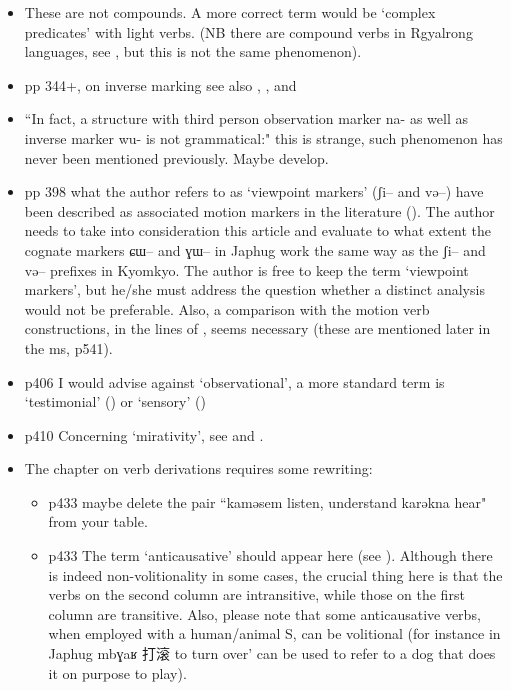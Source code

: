 \documentclass[oldfontcommands,oneside,a4paper,11pt]{article}
\newcommand{\ipa}[1]{{\phon \mbox{#1}}} %
\newcommand{\zh}[1]{{\cn #1}}
\begin{document}
\begin{itemize}
\item These are not compounds. A more correct term would be `complex predicates' with light verbs. (NB there are compound verbs in Rgyalrong languages, see \citet{jacques12incorp}, but this is not the same phenomenon).
\item pp 344+, on inverse marking see also \citet{gongxun14agreement}, \citet{jacques14inverse}, \citet{jacques14rtau} and \citet{lai14person}
\item ``In fact, a structure with third person observation marker na- as well as inverse marker wu- is not
grammatical:" this is strange, such phenomenon has never been mentioned previously. Maybe develop.
\item pp 398 what the author refers to as `viewpoint markers' (\ipa{ʃi--} and \ipa{və--}) have been described as associated motion markers in the literature (\citealt{jacques13harmonization}). The author needs to take into consideration this article and evaluate to what extent the cognate markers \ipa{ɕɯ--} and \ipa{ɣɯ--} in Japhug work the same way as the \ipa{ʃi--} and \ipa{və--} prefixes in Kyomkyo. The author is free to keep the term `viewpoint markers', but he/she must address  the question whether a distinct analysis would not be preferable. Also, a comparison with the motion verb constructions, in the lines of \citet[203]{jacques13harmonization}, seems necessary (these are mentioned later in the ms, p541).
\item p406 I would advise against `observational', a more standard term is `testimonial' (\citealt{hill13hdug}) or `sensory' (\citealt{tournadre14evidentiality})
\item p410 Concerning `mirativity', see \citet{hill13hdug} and \citealt{tournadre14evidentiality}.
\item The chapter on verb derivations requires some rewriting:
\begin{itemize}
\item p433 maybe delete the pair ``kaməsem listen, understand karəkna hear" from your table.
\item  p433 The term `anticausative' should appear here (see \citealt{jacques12demotion}). Although there is indeed non-volitionality in some cases, the crucial thing here is that the verbs on the second column are intransitive, while those on the first column are transitive. Also, please note that some anticausative verbs, when employed with a human/animal S, can be volitional (for instance in Japhug \ipa{mbɣaʁ} \zh{打滚}  to turn over' can be used to refer to a dog that does it on purpose to play).

\end{itemize}
\end{itemize}
\end{document}
